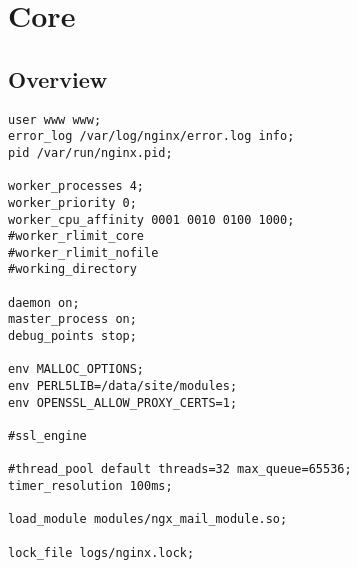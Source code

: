 \part{Core}


\chapter{Overview}


\begin{lstlisting}
user www www;
error_log /var/log/nginx/error.log info;
pid /var/run/nginx.pid;

worker_processes 4;
worker_priority 0;
worker_cpu_affinity 0001 0010 0100 1000;
#worker_rlimit_core 
#worker_rlimit_nofile
#working_directory

daemon on;
master_process on;
debug_points stop;

env MALLOC_OPTIONS;
env PERL5LIB=/data/site/modules;
env OPENSSL_ALLOW_PROXY_CERTS=1;

#ssl_engine 

#thread_pool default threads=32 max_queue=65536;
timer_resolution 100ms;

load_module modules/ngx_mail_module.so;

lock_file logs/nginx.lock;


\end{lstlisting}
